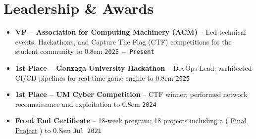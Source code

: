 \documentclass[letterpaper,10pt]{article}
\newcommand{\resumesubtitleII}[1]{{\normalsize\textbf{#1}}}
\newcommand{\resumedate}[1]{{\small\texttt{#1}}}
\newcommand{\stylisticdots}{%
  \leavevmode\cleaders\hbox to 0.8em{%
    \hss\raisebox{0.6ex}{\color{black!40}\rule{1pt}{1pt}}\hss%
  }\hfill\kern0pt%
}
\newcommand{\link}[2]{%
    \href{#1}{\textcolor{linkcolor}{\underline{#2}}}%
}
\newcommand{\resumeSubHeadingListStart}{%
    \begin{itemize}[leftmargin=0pt, label={}]%
}
\newcommand{\resumeSubHeadingListEnd}{\end{itemize}}
\newcommand{\resumeLeadershipItem}[3]{
  \item
    \resumesubtitleII{#1} -- {\small #2} \stylisticdots \resumedate{#3}
}
\begin{document}
\section{\textbf{Leadership \& Awards}}
\resumeSubHeadingListStart
  \resumeLeadershipItem{VP – Association for Computing Machinery (ACM)}{Led 
  technical events, Hackathons, and Capture The Flag (CTF) competitions 
  for the student community}{2025 -- Present}
  \resumeLeadershipItem{1st Place – Gonzaga University Hackathon}{DevOps 
  Lead; architected CI/CD pipelines for real-time game engine}{2025}
  \resumeLeadershipItem{1st Place – UM Cyber Competition}{CTF winner; 
  performed network reconnaissance and exploitation}{2024}
  \resumeLeadershipItem{Front End Certificate}{18-week program; 18 projects 
  including a (\link{https://github.com/aspauldingcode/react-final}%
  {Final Project})}{Jul 2021}
\resumeSubHeadingListEnd

\enlargethispage{10\baselineskip}
\end{document}
